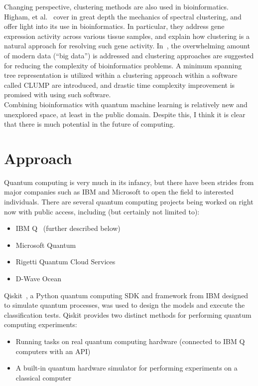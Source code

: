 \documentclass{article}
\begin{document}
  Changing perspective, clustering methods are also used in bioinformatics. Higham, et al.~\cite{higham} cover in great depth the mechanics of spectral clustering, and offer light into its use in bioinformatics. In particular, they address gene expression activity across various tissue samples, and explain how clustering is a natural approach for resolving such gene activity. In~\cite{olman}, the overwhelming amount of modern data (``big data'') is addressed and clustering approaches are suggested for reducing the complexity of bioinformatics problems. A minimum spanning tree representation is utilized within a clustering approach within a software called CLUMP are introduced, and drastic time complexity improvement is promised with using such software. \\

  Combining bioinformatics with quantum machine learning is relatively new and unexplored space, at least in the public domain. Despite this, I think it is clear that there is much potential in the future of computing.

\section*{Approach}
  Quantum computing is very much in its infancy, but there have been strides from major companies such as IBM and Microsoft to open the field to interested individuals. There are several quantum computing projects being worked on right now with public access, including (but certainly not limited to):

  \begin{itemize}
    \ind
    \item IBM Q~\cite{ibm} (further described below)
    \item Microsoft Quantum~\cite{msft}
    \item Rigetti Quantum Cloud Services~\cite{rigetti}
    \item D-Wave Ocean~\cite{dwave}
  \end{itemize}

  Qiskit~\cite{qiskit}, a Python quantum computing SDK and framework from IBM designed to simulate quantum processes, was used to design the models and execute the classification tests. Qiskit provides two distinct methods for performing quantum computing experiments:

    \begin{itemize}
      \item{Running tasks on real quantum computing hardware (connected to IBM Q computers with an API)}
      \item{A built-in quantum hardware simulator for performing experiments on a classical computer}
    \end{itemize}
\end{document}
